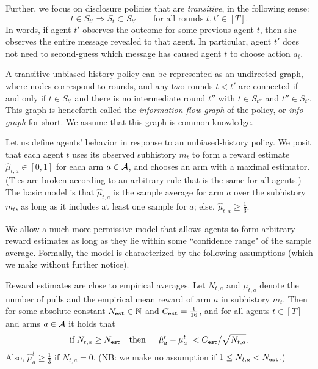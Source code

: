Further, we focus on disclosure policies that are \emph{transitive}, in the following sense:
\[ t\in S_{t'} \Rightarrow S_t\subset S_{t'}
    \qquad \text{for all rounds $t,t'\in [T]$}. \]
In words, if agent $t'$ observes the outcome for some previous agent $t$, then she observes the entire message revealed to that agent. In particular, agent $t'$ does not need to second-guess which message has caused agent $t$ to choose action $a_t$.

A transitive unbiased-history policy can be represented as an undirected graph, where nodes correspond to rounds, and any two rounds $t<t'$ are connected if and only if $t\in S_{t'}$ and there is no intermediate round $t''$ with
    $t\in S_{t''}$ and $t''\in S_{t'}$.
This graph is henceforth called the \emph{information flow graph} of the policy, or \emph{info-graph} for short. We assume that this graph is common knowledge.

 Let us define agents' behavior in response to an unbiased-history policy. We posit that each agent $t$ uses its observed subhistory $m_t$ to form a reward estimate $\hat{\mu}_{t,a} \in [0,1]$ for each arm $a\in \mathcal{A}$, and chooses an arm with a maximal estimator. (Ties are broken according to an arbitrary rule that is the same for all agents.) The basic model is that $\hat{\mu}_{t,a}$ is the sample average for arm $a$ over the subhistory $m_t$, as long as it includes at least one sample for $a$; else, $\hat{\mu}_{t,a}\geq \tfrac13$.

We allow a much more permissive model that allows agents to form arbitrary reward estimates as long as they lie within some ``confidence range" of the sample average. Formally, the model is characterized by the following assumptions (which we make without further notice).


\begin{assumption}\label{ass:embehave}
Reward estimates are close to empirical averages. Let $N_{t,a}$ and $\bar{\mu}_{t,a}$ denote the number of pulls and the empirical mean reward of arm $a$ in subhistory $m_t$. Then for some absolute constant $N_{\mathtt{est}}\in \mathbb{N}$ and $C_{\mathtt{est}}=\tfrac{1}{16}$, and for all agents $t\in [T]$ and arms $a\in\mathcal{A}$ it holds that
\[
\text{if}\; N_{t,a} \geq N_{\mathtt{est}}
\quad\text{then}\quad
    \left|\hat{\mu}^t_a - \bar{\mu}^t_a \right| <
		C_{\mathtt{est}}/\sqrt{N_{t,a}}.
\]
Also,
    $\hat{\mu}^t_a\geq\tfrac13$ if $N_{t,a}=0$.
(NB: we make no assumption if $1\leq N_{t,a}<N_{\mathtt{est}}$.)
\end{assumption}


